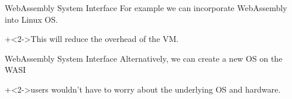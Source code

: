 \begin{frame}{WebAssembly System Interface}{}
    For example we can incorporate WebAssembly into Linux OS.
    \vspace{4ex}

    \onslide+<2->{This will reduce the overhead of the VM.}
\end{frame}


\begin{frame}{WebAssembly System Interface}{}
    Alternatively, we can create a new OS on the WASI
    \vspace{4ex}

    \onslide+<2->{users wouldn't have to worry about the underlying OS and hardware.}
\end{frame}
